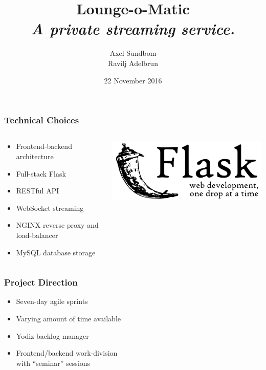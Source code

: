 \documentclass[utf8]{beamer}
\title{Lounge-o-Matic\\{\small \textit{A private streaming service.}}}
\author{Axel Sundbom\\Ravilj Adelbrun}
\date{22 November 2016}
\begin{document}
\begin{frame}
\maketitle
\end{frame}

\begin{frame}
\frametitle{Technical Choices}

\begin{columns}
	\begin{column}{0.6\textwidth}
		\begin{itemize}
			\item Frontend-backend architecture
			\item Full-stack Flask
			\item RESTful API
			\item WebSocket streaming
			\item NGINX reverse proxy and load-balancer
			\item MySQL database storage
		\end{itemize}
	\end{column}

	\begin{column}{0.4\textwidth}
		\includegraphics[width=\textwidth]{img/flask-logo.png}
	\end{column}
\end{columns}
\end{frame}

\begin{frame}
\frametitle{Project Direction}

\begin{itemize}
	\item Seven-day agile sprints
	\item Varying amount of time available
	\item Yodiz backlog manager
	\item Frontend/backend work-division\\with ``seminar'' sessions
\end{itemize}
\end{frame}
\end{document}
